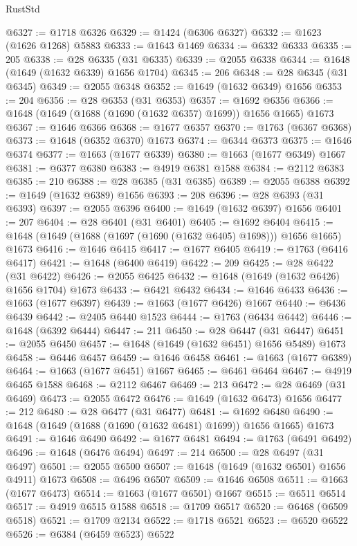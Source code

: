 \begin{lexlean}{RustStd}
\begin{coremodule}
@6327 := @1718 @6326
@6329 := @1424 (@6306 @6327)
@6332 := @1623 (@1626 @1268) @5883
@6333 := @1643 @1469
@6334 := @6332 @6333
@6335 := 205
@6338 := @28 @6335 (@31 @6335)
@6339 := @2055 @6338
@6344 := @1648 (@1649 (@1632 @6339) @1656 @1704)
@6345 := 206
@6348 := @28 @6345 (@31 @6345)
@6349 := @2055 @6348
@6352 := @1649 (@1632 @6349) @1656
@6353 := 204
@6356 := @28 @6353 (@31 @6353)
@6357 := @1692 @6356
@6366 := @1648 (@1649 (@1688 (@1690 (@1632 @6357) @1699)) @1656 @1665) @1673
@6367 := @1646 @6366
@6368 := @1677 @6357
@6370 := @1763 (@6367 @6368)
@6373 := @1648 (@6352 @6370) @1673
@6374 := @6344 @6373
@6375 := @1646 @6374
@6377 := @1663 (@1677 @6339)
@6380 := @1663 (@1677 @6349) @1667
@6381 := @6377 @6380
@6383 := @4919 @6381 @1588
@6384 := @2112 @6383
@6385 := 210
@6388 := @28 @6385 (@31 @6385)
@6389 := @2055 @6388
@6392 := @1649 (@1632 @6389) @1656
@6393 := 208
@6396 := @28 @6393 (@31 @6393)
@6397 := @2055 @6396
@6400 := @1649 (@1632 @6397) @1656
@6401 := 207
@6404 := @28 @6401 (@31 @6401)
@6405 := @1692 @6404
@6415 := @1648 (@1649 (@1688 (@1697 (@1690 (@1632 @6405) @1698))) @1656 @1665) @1673
@6416 := @1646 @6415
@6417 := @1677 @6405
@6419 := @1763 (@6416 @6417)
@6421 := @1648 (@6400 @6419)
@6422 := 209
@6425 := @28 @6422 (@31 @6422)
@6426 := @2055 @6425
@6432 := @1648 (@1649 (@1632 @6426) @1656 @1704) @1673
@6433 := @6421 @6432
@6434 := @1646 @6433
@6436 := @1663 (@1677 @6397)
@6439 := @1663 (@1677 @6426) @1667
@6440 := @6436 @6439
@6442 := @2405 @6440 @1523
@6444 := @1763 (@6434 @6442)
@6446 := @1648 (@6392 @6444)
@6447 := 211
@6450 := @28 @6447 (@31 @6447)
@6451 := @2055 @6450
@6457 := @1648 (@1649 (@1632 @6451) @1656 @5489) @1673
@6458 := @6446 @6457
@6459 := @1646 @6458
@6461 := @1663 (@1677 @6389)
@6464 := @1663 (@1677 @6451) @1667
@6465 := @6461 @6464
@6467 := @4919 @6465 @1588
@6468 := @2112 @6467
@6469 := 213
@6472 := @28 @6469 (@31 @6469)
@6473 := @2055 @6472
@6476 := @1649 (@1632 @6473) @1656
@6477 := 212
@6480 := @28 @6477 (@31 @6477)
@6481 := @1692 @6480
@6490 := @1648 (@1649 (@1688 (@1690 (@1632 @6481) @1699)) @1656 @1665) @1673
@6491 := @1646 @6490
@6492 := @1677 @6481
@6494 := @1763 (@6491 @6492)
@6496 := @1648 (@6476 @6494)
@6497 := 214
@6500 := @28 @6497 (@31 @6497)
@6501 := @2055 @6500
@6507 := @1648 (@1649 (@1632 @6501) @1656 @4911) @1673
@6508 := @6496 @6507
@6509 := @1646 @6508
@6511 := @1663 (@1677 @6473)
@6514 := @1663 (@1677 @6501) @1667
@6515 := @6511 @6514
@6517 := @4919 @6515 @1588
@6518 := @1709 @6517
@6520 := @6468 (@6509 @6518)
@6521 := @1709 @2134
@6522 := @1718 @6521
@6523 := @6520 @6522
@6526 := @6384 (@6459 @6523) @6522

\end{coremodule}
\end{lexlean}
